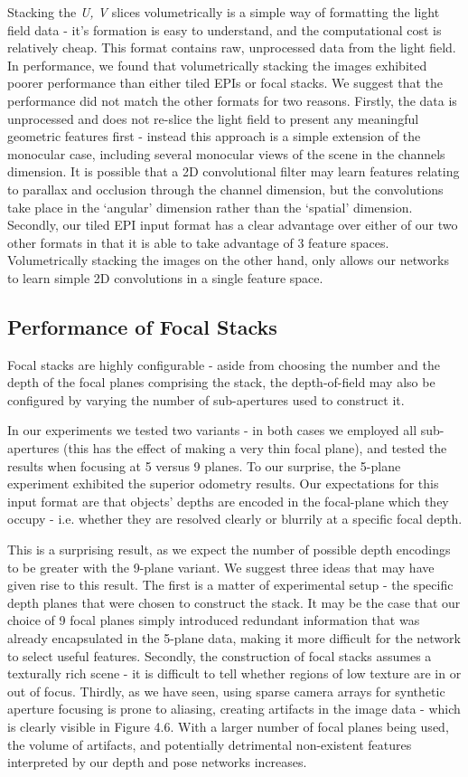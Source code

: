 Stacking the \textit{U, V} slices volumetrically is a simple way of formatting the light field data - it's formation is easy to understand, and the computational cost is relatively cheap. This format contains raw, unprocessed data from the light field. In performance, we found that volumetrically stacking the images exhibited poorer performance than either tiled EPIs or focal stacks. We suggest that the performance did not match the other formats for two reasons. Firstly, the data is unprocessed and does not re-slice the light field to present any meaningful geometric features first - instead this approach is a simple extension of the monocular case, including several monocular views of the scene in the channels dimension. It is possible that a 2D convolutional filter may learn features relating to parallax and occlusion through the channel dimension, but the convolutions take place in the `angular' dimension rather than the `spatial' dimension. Secondly, our tiled EPI input format has a clear advantage over either of our two other formats in that it is able to take advantage of 3 feature spaces. Volumetrically stacking the images on the other hand, only allows our networks to learn simple 2D convolutions in a single feature space. 

\subsection{Performance of Focal Stacks}
Focal stacks are highly configurable - aside from choosing the number and the depth of the focal planes comprising the stack, the depth-of-field may also be configured by varying the number of sub-apertures used to construct it. 

In our experiments we tested two variants - in both cases we employed all sub-apertures (this has the effect of making a very thin focal plane), and tested the results when focusing at 5 versus 9 planes. To our surprise, the 5-plane experiment exhibited the superior odometry results. Our expectations for this input format are that objects' depths are encoded in the focal-plane which they occupy - i.e. whether they are resolved clearly or blurrily at a specific focal depth. 

This is a surprising result, as we expect the number of possible depth encodings to be greater with the 9-plane variant. We suggest three ideas that may have given rise to this result. The first is a matter of experimental setup - the specific depth planes that were chosen to construct the stack. It may be the case that our choice of 9 focal planes simply introduced redundant information that was already encapsulated in the 5-plane data, making it more difficult for the network to select useful features. Secondly, the construction of focal stacks assumes a texturally rich scene - it is difficult to tell whether regions of low texture are in or out of focus. Thirdly, as we have seen, using sparse camera arrays for synthetic aperture focusing is prone to aliasing, creating artifacts in the image data - which is clearly visible in Figure 4.6. With a larger number of focal planes being used, the volume of artifacts, and potentially detrimental non-existent features interpreted by our depth and pose networks increases.

